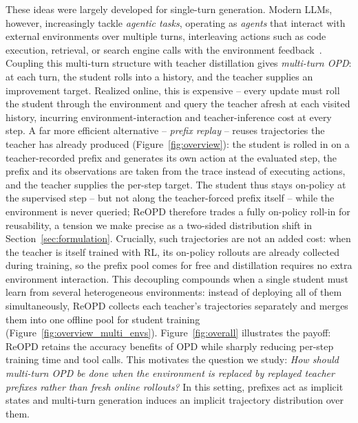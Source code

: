 These ideas were largely developed for single-turn generation. Modern LLMs,
however, increasingly tackle \emph{agentic tasks}, operating as \emph{agents} that
interact with external environments over multiple turns, interleaving actions such as code execution,
retrieval, or search engine calls with the environment
feedback~\citep{yao2022react,schick2023toolformer,nakano2021webgpt,jin2025search}.
Coupling this multi-turn structure with teacher distillation gives \emph{multi-turn OPD}:
at each turn, the student rolls into a history, and the teacher supplies an
improvement target. Realized online, this is expensive -- every update must roll the student through the environment and query the teacher afresh at each visited
history, incurring environment-interaction and teacher-inference cost at every
step. A far more efficient alternative -- \emph{prefix replay} -- reuses trajectories the teacher has already
produced (Figure~\ref{fig:overview}): the student is rolled in on a teacher-recorded prefix and generates its
own action at the evaluated step, the prefix and its observations are taken from the
trace instead of executing actions, and the teacher supplies the per-step target.
The student thus stays on-policy at the supervised step -- but not along the
teacher-forced prefix itself -- while the environment is never queried; ReOPD therefore
trades a fully on-policy roll-in for reusability, a tension we make precise as a
two-sided distribution shift in Section~\ref{sec:formulation}. Crucially, such trajectories are not an added cost: when the teacher
is itself trained with RL, its on-policy rollouts are already collected during
training, so the prefix pool comes for free and distillation requires no extra
environment interaction. This decoupling compounds when a single student must learn
from several heterogeneous environments: instead of deploying all of them
simultaneously, ReOPD collects each teacher's trajectories separately and merges them
into one offline pool for student training (Figure~\ref{fig:overview_multi_envs}).
Figure~\ref{fig:overall} illustrates the payoff: ReOPD retains the
accuracy benefits of OPD while sharply reducing per-step training time and tool
calls. This motivates the question we study:
\emph{How should multi-turn OPD be done when the environment is
replaced by replayed teacher prefixes rather than fresh online rollouts?} In
this setting, prefixes act as implicit states and multi-turn generation induces
an implicit trajectory distribution over them.

